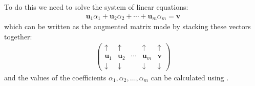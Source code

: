 \documentclass[letterpaper,10pt,english]{jupyterBook}
\begin{document}
\sphinxAtStartPar
To do this we need to solve the system of linear equations:
\begin{equation*}
\begin{split} \mathbf{u}_1 \alpha_1 + \mathbf{u}_2 \alpha_2 + \cdots + \mathbf{u}_m \alpha_m = \mathbf{v}\end{split}
\end{equation*}
\sphinxAtStartPar
which can be written as the augmented matrix made by stacking these vectors together:
\begin{equation*}
\begin{split} \left( \begin{array}{cccc|c}
    \uparrow & \uparrow & & \uparrow & \uparrow \\
    \mathbf{u}_1 & \mathbf{u}_2 & \cdots & \mathbf{u}_m & \mathbf{v} \\
    \downarrow & \downarrow & & \downarrow & \downarrow
\end{array} \right)\end{split}
\end{equation*}
\sphinxAtStartPar
and the values of the coefficients \(\alpha_1, \alpha_2, \ldots, \alpha_m\) can be calculated using {\hyperref[\detokenize{_pages/2.3_Gaussian_elimination:gaussian-elimination-section}]{}}.
\label{_pages/3.4_Linear_combinations:linear-combination-of-vectors-example}
\end{document}
